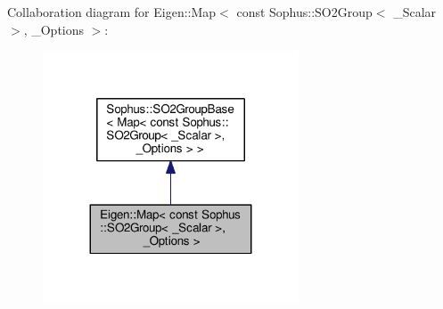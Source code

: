 Collaboration diagram for Eigen\+:\+:Map$<$ const Sophus\+:\+:S\+O2\+Group$<$ \+\_\+\+Scalar $>$, \+\_\+\+Options $>$\+:
\nopagebreak
\begin{figure}[H]
\begin{center}
\leavevmode
\includegraphics[width=215pt]{class_eigen_1_1_map_3_01const_01_sophus_1_1_s_o2_group_3_01___scalar_01_4_00_01___options_01_4__coll__graph}
\end{center}
\end{figure}
